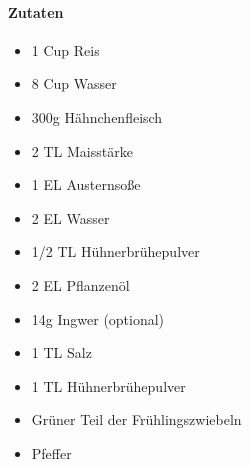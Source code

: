 \newpage
{}
\paragraph{Zutaten}
\begin{itemize}[noitemsep]
	\item 1 Cup Reis
	\item 8 Cup Wasser
	\vspace{0.5cm}
	\item 300g Hähnchenfleisch
	\item 2 TL Maisstärke
	\item 1 EL Austernsoße
	\item 2 EL Wasser
	\item 1/2 TL Hühnerbrühepulver
	\item 2 EL Pflanzenöl
	\vspace{0.5cm}
	\item 14g Ingwer (optional)
	\item 1 TL Salz
	\item 1 TL Hühnerbrühepulver
	\item Grüner Teil der Frühlingszwiebeln
	\item Pfeffer
\end{itemize}
